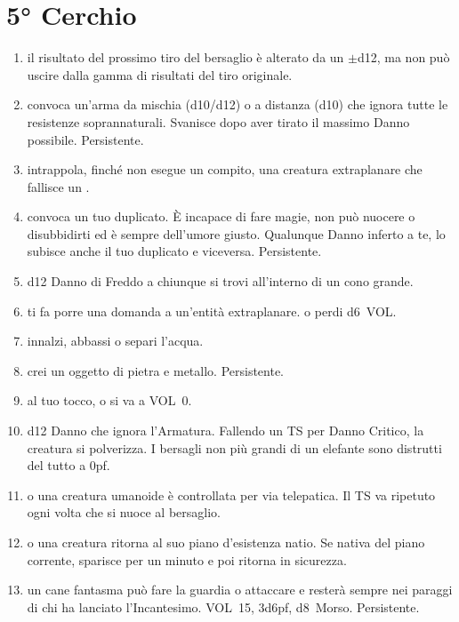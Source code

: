 \documentclass[itdr]{subfiles}
\begin{document}
\vfill
\break

\section{5° Cerchio}
\def \spellcircle {5}
\begin{enumerate}
	\item {} il risultato del prossimo tiro del bersaglio è alterato da un $\pm$d12, ma non può uscire dalla gamma di risultati del tiro originale.
	\item {} convoca un'arma da mischia (d10/d12) o a distanza (d10) che ignora tutte le resistenze soprannaturali. Svanisce dopo aver tirato il massimo Danno possibile. Persistente.
	\item {} intrappola, finché non esegue un compito, una creatura extraplanare che fallisce un .
	\item {} convoca un tuo duplicato. È incapace di fare magie, non può nuocere o disubbidirti ed è sempre dell'umore giusto. Qualunque Danno inferto a te, lo subisce anche il tuo duplicato e viceversa. \mbox{Persistente}.
	\item {} d12 Danno di Freddo a chiunque si trovi all'interno di un cono grande.
	\item {} ti fa porre una domanda a un'entità extraplanare.  o perdi d6~VOL.
	\item {} innalzi, abbassi o separi l'acqua.
	\item {} crei un oggetto di pietra e metallo. Persistente.
	\item {} al tuo tocco,  o si va a VOL~0.
	\item {} d12 Danno che ignora l'Armatura. Fallendo un TS per Danno Critico, la creatura si polverizza. I bersagli non più grandi di un elefante sono distrutti del tutto a 0pf.
	\item {}  o una creatura umanoide è controllata per via telepatica. Il TS va ripetuto ogni volta che si nuoce al bersaglio.
	\item {}  o una creatura ritorna al suo piano d'esistenza natio. Se nativa del piano corrente, sparisce per un minuto e poi ritorna in sicurezza.
	\item {} un cane fantasma può fare la guardia o attaccare e resterà sempre nei paraggi di chi ha lanciato l'Incantesimo. VOL~15, 3d6pf, d8~Morso. Persistente.

\end{enumerate}
\end{document}
